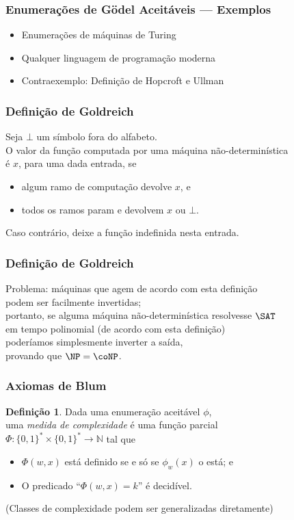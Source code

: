 \documentclass[utf8,notheorems]{beamer}
\theoremstyle{definition}
\newtheorem*{definition}{Definição}
\begin{document}
\begin{frame}
    \frametitle{Enumerações de Gödel Aceitáveis --- Exemplos}
    \begin{itemize}
        \item Enumerações de máquinas de Turing
        \item Qualquer linguagem de programação moderna
        \item Contraexemplo: Definição de Hopcroft e Ullman
    \end{itemize}
\end{frame}

\begin{frame}
    \frametitle{Definição de Goldreich}
    Seja $\bot$ um símbolo fora do alfabeto. \\
    O valor da função computada por uma máquina não-determinística \\
    é $x$, para uma dada entrada, se
    \begin{itemize}
        \item algum ramo de computação devolve $x$, e
        \item todos os ramos param e devolvem $x$ ou $\bot$.
    \end{itemize}
    Caso contrário, deixe a função indefinida nesta entrada.
    \cite[p.~313]{HopcroftUllman1979}
\end{frame}

\begin{frame}
    \frametitle{Definição de Goldreich}
    Problema: máquinas que agem de acordo com esta definição \\
    podem ser facilmente invertidas;\\
    portanto, se alguma máquina não-determinística resolvesse $\SAT$ \\
    em tempo polinomial (de acordo com esta definição) \\
    poderíamos simplesmente inverter a saída, \\
    provando que $\NP = \coNP$.
\end{frame}

\begin{frame}
    \frametitle{Axiomas de Blum}
    \begin{definition}
        Dada uma enumeração aceitável $\phi$, \\
        uma \emph{medida de complexidade} é uma função parcial \\
        $\Phi: \{0, 1\}^* \times \{0, 1\}^* \to \mathbb N$ tal que
        \begin{itemize}
            \item $\Phi(w, x)$ está definido se e só se $\phi_w(x)$ o está; e \\
            \item O predicado ``$\Phi(w, x) = k$'' é decidível.
        \end{itemize}
    \end{definition}
    \cite[p.~324]{Blum1967}

    (Classes de complexidade podem ser generalizadas diretamente)
\end{frame}
\end{document}
